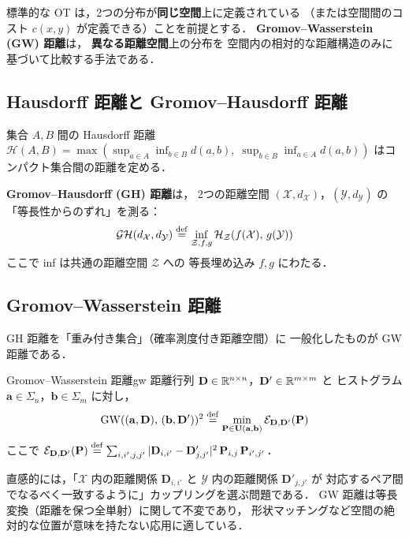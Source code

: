 標準的な OT は，2つの分布が\textbf{同じ空間}上に定義されている
（または空間間のコスト $c(x,y)$ が定義できる）ことを前提とする．
\textbf{Gromov--Wasserstein (GW) 距離}は，
\textbf{異なる距離空間}上の分布を
空間内の相対的な距離構造のみに基づいて比較する手法である．

\subsection{Hausdorff 距離と Gromov--Hausdorff 距離}\label{subsec:hausdorff}

集合 $A, B$ 間の Hausdorff 距離
$\mathcal{H}(A, B) = \max(\sup_{a \in A} \inf_{b \in B} d(a,b),\;
\sup_{b \in B} \inf_{a \in A} d(a,b))$
はコンパクト集合間の距離を定める．

\textbf{Gromov--Hausdorff (GH) 距離}は，
2つの距離空間 $(\mathcal{X}, d_\mathcal{X})$，$(\mathcal{Y}, d_\mathcal{Y})$ の
「等長性からのずれ」を測る：
\[
  \mathcal{GH}(d_\mathcal{X}, d_\mathcal{Y})
  \overset{\mathrm{def}}{=} \inf_{\mathcal{Z}, f, g}
  \mathcal{H}_\mathcal{Z}(f(\mathcal{X}),\, g(\mathcal{Y}))
\]
ここで inf は共通の距離空間 $\mathcal{Z}$ への
等長埋め込み $f, g$ にわたる．

\subsection{Gromov--Wasserstein 距離}\label{subsec:gw-distance}

GH 距離を「重み付き集合」（確率測度付き距離空間）に
一般化したものが GW 距離である．

\begin{definition}{Gromov--Wasserstein 距離}{gw}
距離行列 $\mathbf{D} \in \mathbb{R}^{n \times n}$，$\mathbf{D}' \in \mathbb{R}^{m \times m}$ と
ヒストグラム $\mathbf{a} \in \Sigma_n$，$\mathbf{b} \in \Sigma_m$ に対し，
\begin{equation}\label{eq:gw}
  \mathrm{GW}((\mathbf{a}, \mathbf{D}),\, (\mathbf{b}, \mathbf{D}'))^2
  \overset{\mathrm{def}}{=} \min_{\mathbf{P} \in \mathbf{U}(\mathbf{a}, \mathbf{b})}
  \mathcal{E}_{\mathbf{D}, \mathbf{D}'}(\mathbf{P})
\end{equation}
ここで
$\mathcal{E}_{\mathbf{D}, \mathbf{D}'}(\mathbf{P})
\overset{\mathrm{def}}{=} \sum_{i,i',j,j'}
|\mathbf{D}_{i,i'} - \mathbf{D}'_{j,j'}|^2\,
\mathbf{P}_{i,j}\, \mathbf{P}_{i',j'}$．
\end{definition}

直感的には，「$\mathcal{X}$ 内の距離関係 $\mathbf{D}_{i,i'}$ と
$\mathcal{Y}$ 内の距離関係 $\mathbf{D}'_{j,j'}$ が
対応するペア間でなるべく一致するように」カップリングを選ぶ問題である．
GW 距離は等長変換（距離を保つ全単射）に関して不変であり，
形状マッチングなど空間の絶対的な位置が意味を持たない応用に適している．


